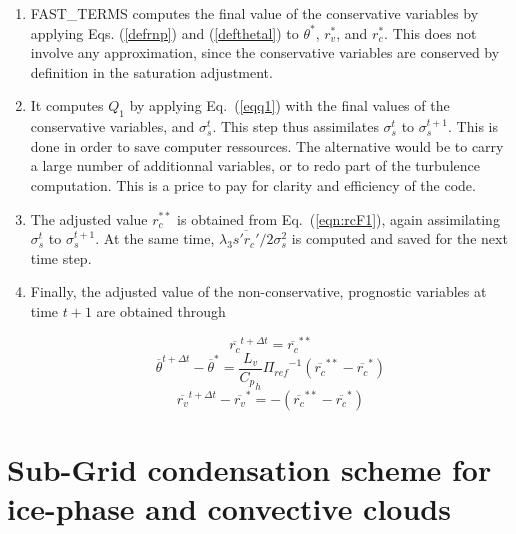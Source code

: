 \begin{enumerate}
\item FAST\_TERMS computes the final value of the conservative variables
by applying Eqs. (\ref{defrnp}) and (\ref{defthetal}) to $\theta^*$, $r_v^*$,
and $r_c^*$.
This does not involve any approximation, since the conservative variables
are conserved by definition in the saturation adjustment.

\item It computes $Q_1$ by applying Eq.~(\ref{eqq1}) with the final values of
the conservative variables, and $\sigma_s^t$. This step thus assimilates
$\sigma_s^t$ to $\sigma_s^{t+1}$. This is done in order to save computer
ressources. The alternative would be to carry a large number of additionnal
variables, or to redo part of the turbulence computation. This is a price
to pay for clarity and efficiency of the code.

\item The adjusted value $r_c^{**}$ is obtained from Eq.~(\ref{eqn:rcF1}), again
assimilating $\sigma_s^t$ to $\sigma_s^{t+1}$. At the same time,
$\lambda_3 \overline{s'r_c'} / 2 \sigma_s^2$ is
computed and saved for the next time step.

\item Finally, the adjusted value of the non-conservative, prognostic
variables at time $t+1$ are obtained through

\begin{equation}\label{eqn:rct+1}
{\overline{r_{c}}}^{t+\Delta t} = {\overline{r_{c}}}^{**}
\end{equation}
\begin{equation}\label{eqn:thetat+1}
{\overline{\theta}}^{t+\Delta t} - {\overline{\theta}}^{*} =
\dfrac{L_{v}}{{C_{p}}_{h}}{{\Pi}_{ref}}^{-1}
\left( {\overline{r_{c}}}^{**} - {\overline{r_{c}}}^{*} \right)
\end{equation}
\begin{equation}\label{eqn:rvt+1}
{\overline{r_{v}}}^{t+\Delta t} - {\overline{r_{v}}}^{*} =
-\left( {\overline{r_{c}}}^{**} - {\overline{r_{c}}}^{*} \right)
\end{equation}

\end{enumerate}

\section{Sub-Grid condensation scheme for ice-phase and convective clouds}

